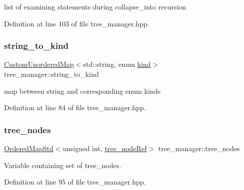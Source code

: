 list of examining statements during collapse\+\_\+into recursion 



Definition at line 103 of file tree\+\_\+manager.\+hpp.

\mbox{\label{classtree__manager_a256acc0499d0b773e6a074e35c5a9987}} 
\subsubsection{\texorpdfstring{string\+\_\+to\+\_\+kind}{string\_to\_kind}}
{\footnotesize\ttfamily \hyperlink{custom__map_8hpp_ad1ed68f2ff093683ab1a33522b144adc}{Custom\+Unordered\+Map}$<$std\+::string, enum \hyperlink{tree__common_8hpp_a9efbd7c7191fb190b76c2fd05d6e7b45}{kind}$>$ tree\+\_\+manager\+::string\+\_\+to\+\_\+kind\hspace{0.3cm}{\ttfamily [private]}}



map between string and corresponding enum kinds 



Definition at line 84 of file tree\+\_\+manager.\+hpp.

\mbox{\label{classtree__manager_a649bd69a0ce6482ae28be79a906fa191}} 
\subsubsection{\texorpdfstring{tree\+\_\+nodes}{tree\_nodes}}
{\footnotesize\ttfamily \hyperlink{custom__map_8hpp_a1609f0ce858c41bf505bdff46f230a87}{Ordered\+Map\+Std}$<$unsigned int, \hyperlink{tree__node_8hpp_a6ee377554d1c4871ad66a337eaa67fd5}{tree\+\_\+node\+Ref}$>$ tree\+\_\+manager\+::tree\+\_\+nodes\hspace{0.3cm}{\ttfamily [private]}}



Variable containing set of tree\+\_\+nodes. 



Definition at line 95 of file tree\+\_\+manager.\+hpp.




